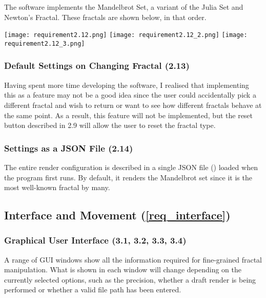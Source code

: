 The software implements the Mandelbrot Set, a variant of the Julia Set and Newton's Fractal. These fractals are shown below, in that order.

\FloatBarrier
\begin{figure*}[htp]
	\centering
	\texttt{[image: requirement2.12.png]}
	\texttt{[image: requirement2.12\_2.png]}
	\texttt{[image: requirement2.12\_3.png]}
\end{figure*}
\FloatBarrier

\subsubsection{Default Settings on Changing Fractal (2.13)}

Having spent more time developing the software, I realised that implementing this as a feature may not be a good idea since the user could accidentally pick a different fractal and wish to return or want to see how different fractals behave at the same point. As a result, this feature will not be implemented, but the reset button described in 2.9 will allow the user to reset the fractal type.

\subsubsection{Settings as a JSON File (2.14)}

The entire render configuration is described in a single JSON file () loaded when the program first runs. By default, it renders the Mandelbrot set since it is the most well-known fractal by many.


\subsection{Interface and Movement (\ref{req_interface})}

\subsubsection{Graphical User Interface (3.1, 3.2, 3.3, 3.4)}

A range of GUI windows show all the information required for fine-grained fractal manipulation. What is shown in each window will change depending on the currently selected options, such as the precision, whether a draft render is being performed or whether a valid file path has been entered.

